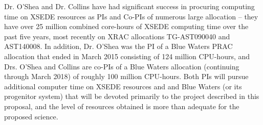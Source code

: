 Dr. O'Shea and Dr. Collins have had significant success in procuring
computing time on XSEDE resources as PIs and Co-PIs of numerous large
allocation -- they have over 25 million combined core-hours of XSEDE
computing time over the past five years, most recently on XRAC
allocations TG-AST090040 and AST140008.  In addition, Dr. O'Shea was
the PI of a Blue Waters PRAC allocation that ended in March 2015
consisting of 124 million CPU-hours, and Drs. O'Shea and Collins are
co-PIs of a  Blue Waters allocation (continuing through March 2018) 
of roughly 100 million CPU-hours.    Both PIs will pursue additional
computer time on XSEDE resources and and Blue Waters (or its
progenitor system) that will be devoted primarily to the
project described in this proposal, and the level of resources
obtained is more than adequate for the proposed science.


